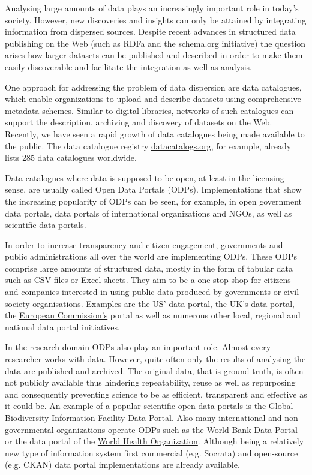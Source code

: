Analysing large amounts of data plays an increasingly important role in today's society. 
However, new discoveries and insights can only be attained by integrating information from dispersed sources. 
Despite recent advances in structured data publishing on the Web (such as RDFa and the schema.org initiative) the question arises how larger datasets can be published and described in order to make them easily discoverable and facilitate the integration as well as analysis.

One approach for addressing the problem of data dispersion are data catalogues, which enable organizations to upload and describe datasets using comprehensive metadata schemes. 
Similar to digital libraries, networks of such catalogues can support the description, archiving and discovery of datasets on the Web. 
Recently, we have seen a rapid growth of data catalogues being made available to the public. 
The data catalogue registry \href{http://datacatalogs.org}{datacatalogs.org}, for example, already lists 285 data catalogues worldwide. 

Data catalogues where data is supposed to be open, at least in the licensing sense, are usually called Open Data Portals (ODPs).
Implementations that show the increasing popularity of ODPs can be seen, for example, in open government data portals, data portals of international organizations and NGOs, as well as scientific data portals.

In order to increase transparency and citizen engagement, governments and public administrations all over the world are implementing ODPs. 
These ODPs comprise large amounts of structured data, mostly in the form of tabular data such as CSV files or Excel sheets. 
They aim to be a one-stop-shop for citizens and companies interested in using public data produced by governments or civil society organisations.
Examples are the \href{http://data.gov}{US' data portal}, the \href{http://data.gov.uk}{UK's data portal}, the \href{http://open-data.europa.eu}{European Commission's} portal as well as numerous other local, regional and national data portal initiatives.

In the research domain ODPs also play an important role.
Almost every researcher works with data. 
However, quite often only the results of analysing the data are published and archived. 
The original data, that is ground truth, is often not publicly available thus hindering repeatability, reuse as well as repurposing and consequently preventing science to be as efficient, transparent and effective as it could be. 
An example of a popular scientific open data portals is the \href{http://data.gbif.org}{Global Biodiversity Information Facility Data Portal}.
Also many international and non-governmental organizations operate ODPs such as the \href{http://data.worldbank.org}{World Bank Data Portal} or the data portal of the \href{http://apps.who.int/gho/data/}{World Health Organization}.
Although being a relatively new type of information system first commercial (e.g. Socrata) and open-source (e.g. CKAN) data portal implementations are already available.

